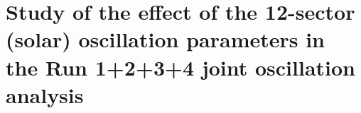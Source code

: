 \clearpage

\section {Study of the effect of the 12-sector (solar) oscillation parameters in the Run 1+2+3+4 joint oscillation analysis}
\label{app:solar}
